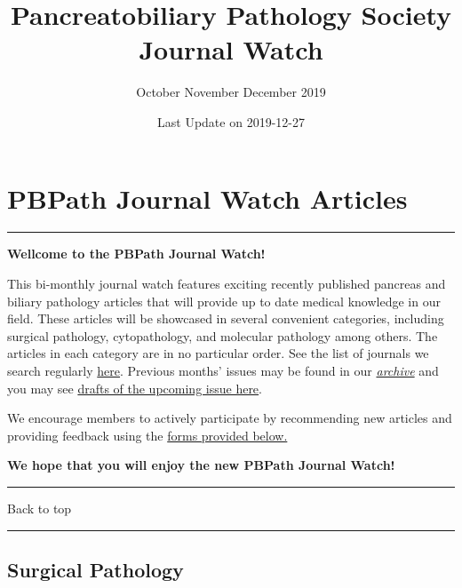\documentclass[
]{article}
\title{Pancreatobiliary Pathology Society Journal Watch}
\subtitle{October November December 2019}
\author{}
\date{\vspace{-2.5em}Last Update on 2019-12-27}
\renewcommand{\linethickness}{0.05em}
\begin{document}
\maketitle

{
\setcounter{tocdepth}{5}
\tableofcontents
}
\pagebreak

\hypertarget{pbpath_jw}{%
\section{PBPath Journal Watch Articles}\label{pbpath_jw}}

\begin{center}\rule{0.5\linewidth}{\linethickness}\end{center}

\textbf{Wellcome to the PBPath Journal Watch!}

This bi-monthly journal watch features exciting recently published
pancreas and biliary pathology articles that will provide up to date
medical knowledge in our field. These articles will be showcased in
several convenient categories, including surgical pathology,
cytopathology, and molecular pathology among others. The articles in
each category are in no particular order. See the list of journals we
search regularly \href{http://pbpath.org/pbpath-journal-watch/}{here}.
Previous months' issues may be found in our
\emph{\href{http://pbpath.org/journal-watch-archive/}{archive}} and you
may see \href{http://pbpath.org/journal-watch-upcoming-issue/}{drafts of
the upcoming issue here}.

We encourage members to actively participate by recommending new
articles and providing feedback using the
\protect\hyperlink{feedback}{forms provided below.}

\textbf{We hope that you will enjoy the new PBPath Journal Watch!}

\begin{center}\rule{0.5\linewidth}{\linethickness}\end{center}

Back to top

\begin{center}\rule{0.5\linewidth}{\linethickness}\end{center}

\pagebreak

\hypertarget{surgical_pathology}{%
\subsection{Surgical Pathology}\label{surgical_pathology}}
\end{document}
